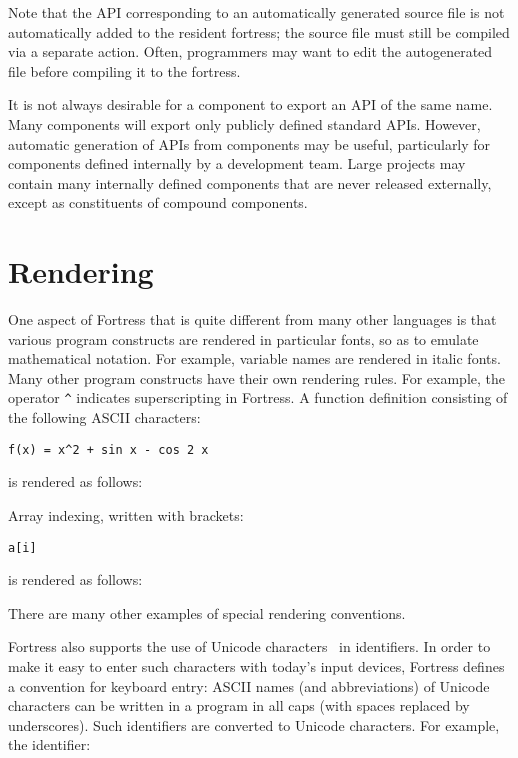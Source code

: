 Note that the API corresponding to an automatically generated source
file is not automatically added to the resident fortress; the source
file must still be compiled via a separate action. Often, programmers
may want to edit the autogenerated file before compiling it to the
fortress.

It is not always desirable for a component to export an API of the same name.
Many components will export only publicly defined standard APIs.
However, automatic generation of APIs from components may be useful,
particularly for components defined internally by a development team.
Large projects may contain many internally defined components that
are never released externally,
except as constituents of compound components.

\section{Rendering}

One aspect of Fortress that is quite different from many other languages
is that various program constructs are rendered in particular fonts,
so as to emulate mathematical notation.
For example, variable names are rendered in italic fonts.
Many other program constructs have their own rendering rules. For
example, the operator \verb$^$ indicates superscripting in
Fortress.
A function definition consisting of the following ASCII characters:

\begin{verbatim}
f(x) = x^2 + sin x - cos 2 x
\end{verbatim}

is rendered as follows:



Array indexing, written with brackets:

\begin{verbatim}
a[i]
\end{verbatim}

is rendered as follows:



There are many other examples of special rendering conventions.

Fortress also supports the use of Unicode characters~\cite{Unicode} in
identifiers. In order to make it easy to enter such characters with
today's input devices, Fortress defines a convention for keyboard
entry: ASCII names (and abbreviations) of Unicode characters can be
written in a program in all caps (with spaces replaced by underscores).
Such identifiers are converted to Unicode characters. For example,
the identifier:

